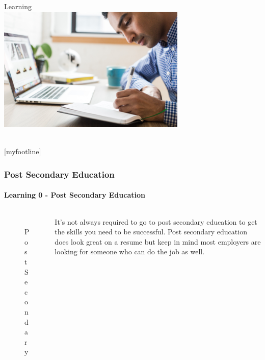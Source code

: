 \documentclass[aspectratio=169]{beamer}
\begin{document}
\begin{frame}[t]
  \begin{center}
    \begingroup
    \fontsize{20pt}{20pt}\selectfont
    Learning \\
    \endgroup
    \bigskip
    \includegraphics[width=9cm,keepaspectratio]{learning} \\
    \bigskip
    \inserttitle \\
  \end{center}
\end{frame}

[myfootline]

\begin{frame}
  \frametitle{Post Secondary Education}
  \framesubtitle{Learning 0 - Post Secondary Education}
  \begin{columns}[onlytextwidth]
    \begin{column}{.30\textwidth}
      \begin{figure}
        \includegraphics[width=5.5cm,keepaspectratio]{post_secondary}
        \caption{Post Secondary}
      \end{figure}
    \end{column}
    \hfill
    \begin{column}{.60\textwidth}
        \begin{tcolorbox}[title=success.log,colback=gray]
          It's not always required to go to post secondary education to get the skills you need to be successful. Post secondary education does look great on a resume but keep in mind most employers are looking for someone who can do the job as well.
        \end{tcolorbox}
    \end{column}
  \end{columns}
\end{frame}
\end{document}
